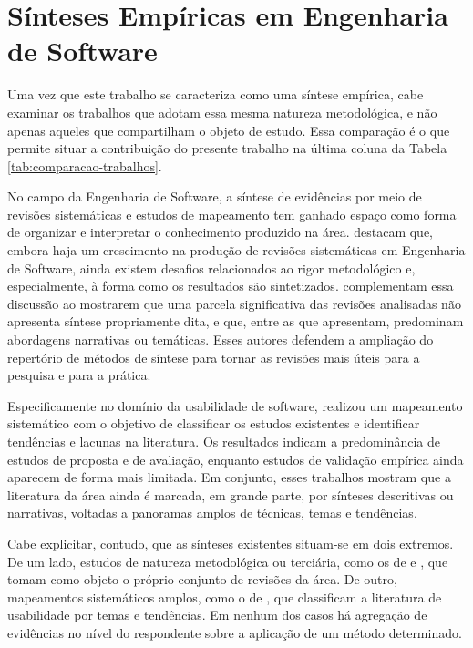 \section{Sínteses Empíricas em Engenharia de Software}
\label{sec:sinteses-empiricas}

Uma vez que este trabalho se caracteriza como uma síntese empírica, cabe examinar os trabalhos que adotam essa mesma natureza metodológica, e não apenas aqueles que compartilham o objeto de estudo. Essa comparação é o que permite situar a contribuição do presente trabalho na última coluna da Tabela \ref{tab:comparacao-trabalhos}.

No campo da Engenharia de Software, a síntese de evidências por meio de revisões sistemáticas e estudos de mapeamento tem ganhado espaço como forma de organizar e interpretar o conhecimento produzido na área.  destacam que, embora haja um crescimento na produção de revisões sistemáticas em Engenharia de Software, ainda existem desafios relacionados ao rigor metodológico e, especialmente, à forma como os resultados são sintetizados.  complementam essa discussão ao mostrarem que uma parcela significativa das revisões analisadas não apresenta síntese propriamente dita, e que, entre as que apresentam, predominam abordagens narrativas ou temáticas. Esses autores defendem a ampliação do repertório de métodos de síntese para tornar as revisões mais úteis para a pesquisa e para a prática.

Especificamente no domínio da usabilidade de software,  realizou um mapeamento sistemático com o objetivo de classificar os estudos existentes e identificar tendências e lacunas na literatura. Os resultados indicam a predominância de estudos de proposta e de avaliação, enquanto estudos de validação empírica ainda aparecem de forma mais limitada. Em conjunto, esses trabalhos mostram que a literatura da área ainda é marcada, em grande parte, por sínteses descritivas ou narrativas, voltadas a panoramas amplos de técnicas, temas e tendências.

Cabe explicitar, contudo, que as sínteses existentes situam-se em dois extremos. De um lado, estudos de natureza metodológica ou terciária, como os de  e , que tomam como objeto o próprio conjunto de revisões da área. De outro, mapeamentos sistemáticos amplos, como o de , que classificam a literatura de usabilidade por temas e tendências. Em nenhum dos casos há agregação de evidências no nível do respondente sobre a aplicação de um método determinado.


